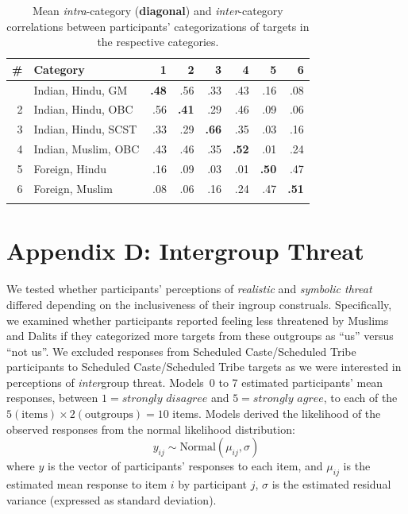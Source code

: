 \documentclass[12pt, a4paper]{article}
\begin{document}
\begin{table}
\centering
{}
\caption[Mean intra and inter-category correlations for target categorizations]{Mean \emph{intra}-category (\textbf{diagonal}) and \emph{inter}-category correlations between participants' categorizations of targets in the respective categories.}
\small	
\begin{tabular}{rlrrrr|rr} \toprule
\# & Category            & 1   & 2   & 3   & 4   & 5   & 6   \\ \midrule \addlinespace
1  & Indian, Hindu, GM   & \textbf{.48} & .56 & .33 & .43 & .16 & .08 \\
2  & Indian, Hindu, OBC  & .56 & \textbf{.41} & .29 & .46 & .09 & .06 \\
3  & Indian, Hindu, SCST & .33 & .29 & \textbf{.66} & .35 & .03 & .16 \\
4  & Indian, Muslim, OBC & .43 & .46 & .35 & \textbf{.52} & .01 & .24 \\ \midrule
5  & Foreign, Hindu      & .16 & .09 & .03 & .01 & \textbf{.50} & .47 \\
6  & Foreign, Muslim     & .08 & .06 & .16 & .24 & .47 & \textbf{.51} \\ \addlinespace \bottomrule
\end{tabular}
\label{tab:c-1}
\end{table}

\section{Appendix D: Intergroup Threat}

We tested whether participants' perceptions of \emph{realistic} and \emph{symbolic threat} differed depending on the inclusiveness of their ingroup construals. Specifically, we examined whether participants reported feeling less threatened by Muslims and Dalits if they categorized more targets from these outgroups as ``us'' versus ``not us''. We excluded responses from Scheduled Caste/Scheduled Tribe participants to Scheduled Caste/Scheduled Tribe targets as we were interested in perceptions of \emph{inter}group threat. Models~0 to 7 estimated participants' mean responses, between $1 = \textit{strongly disagree}$ and $5 = \textit{strongly agree}$, to each of the $ 5 (\text{items}) \times 2 (\text{outgroups}) = 10$ items. Models derived the likelihood of the observed responses from the normal likelihood distribution: $$ y_{ij} \sim \text{Normal} (\mu_{ij}, \sigma) $$ where $y$ is the vector of participants' responses to each item, and $\mu_{ij}$ is the estimated mean response to item $i$ by participant $j$, $\sigma$ is the estimated residual variance (expressed as standard deviation).
\end{document}
